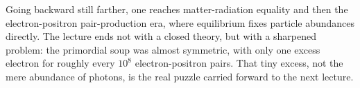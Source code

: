 Going backward still farther, one reaches matter-radiation equality and then the electron-positron pair-production era, where equilibrium fixes particle abundances directly. The lecture ends not with a closed theory, but with a sharpened problem: the primordial soup was almost symmetric, with only one excess electron for roughly every \(10^8\) electron-positron pairs. That tiny excess, not the mere abundance of photons, is the real puzzle carried forward to the next lecture.